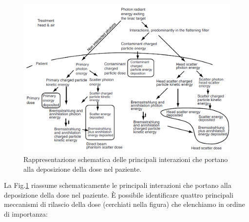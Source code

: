 \begin{figure}
\centering
\includegraphics[width=.9\textwidth]{./cap1/processes.png}
\caption{Rappresentazione schematica delle principali interazioni che portano alla deposizione della dose nel paziente.}
\label{fig:processes}
\end{figure}
\vspace{.2cm}
La Fig.\ref{fig:processes} riassume schematicamente le principali interazioni che portano alla deposizione della dose nel paziente. \`{E} possibile identificare quattro principali meccanismi di rilascio della dose (cerchiati nella figura) che elenchiamo in ordine di importanza:
